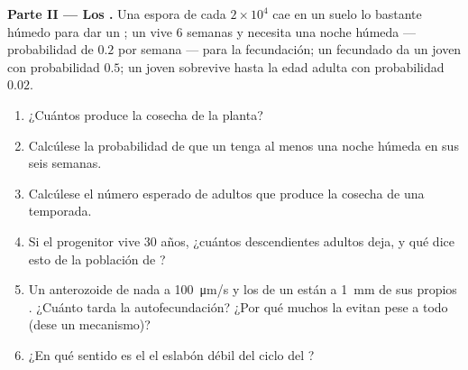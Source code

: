 \begin{problem}
\medskip
\noindent\textbf{Parte II --- Los .}
Una espora de cada $2\times 10^{4}$ cae en un suelo lo bastante húmedo
para dar un ; un  vive \num{6} semanas y necesita una noche
húmeda --- probabilidad de $0.2$ por semana --- para la fecundación; un
 fecundado da un  joven con probabilidad
$0.5$; un  joven sobrevive hasta la edad adulta con probabilidad
$0.02$.
\begin{enumerate}[resume]
  \item ¿Cuántos  produce la cosecha de la planta?
  \item Calcúlese la probabilidad de que un  tenga al menos una
        noche húmeda en sus seis semanas.
  \item Calcúlese el número esperado de  adultos que produce la
        cosecha de una temporada.
  \item Si el progenitor vive \num{30} años, ¿cuántos descendientes
        adultos deja, y qué dice esto de la población de ?
  \item Un anterozoide de  nada a \qty{100}{\micro m/s} y los
         de un  están a \qty{1}{mm} de sus propios
        . ¿Cuánto tarda la autofecundación? ¿Por qué muchos
         la evitan pese a todo (dese un mecanismo)?
  \item ¿En qué sentido es el  el eslabón débil del ciclo del
        ?
\end{enumerate}


\end{problem}
